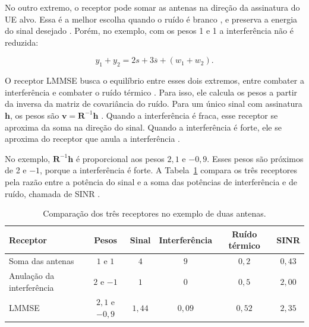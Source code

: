 No outro extremo, o receptor pode somar as antenas na direção da assinatura do UE alvo. Essa é a melhor escolha quando o ruído é branco \cite[p.~359]{tse-viswanath}, e preserva a energia do sinal desejado \cite[p.~358]{tse-viswanath}. Porém, no exemplo, com os pesos 1 e 1 a interferência não é reduzida:

$$
y_1 + y_2 = 2s + 3\overline{s} + (w_1 + w_2).
$$



O receptor LMMSE busca o equilíbrio entre esses dois extremos, entre combater a interferência e combater o ruído térmico \cite[p.~358]{tse-viswanath}. Para isso, ele calcula os pesos a partir da inversa da matriz de covariância do ruído. Para um único sinal com assinatura $\mathbf{h}$, os pesos são $\mathbf{v}=\mathbf{R}^{-1}\mathbf{h}$ \cite[p.~359]{tse-viswanath}. Quando a interferência é fraca, esse receptor se aproxima da soma na direção do sinal. Quando a interferência é forte, ele se aproxima do receptor que anula a interferência \cite[p.~360]{tse-viswanath}.

No exemplo, $\mathbf{R}^{-1}\mathbf{h}$ é proporcional aos pesos $2{,}1$ e $-0{,}9$. Esses pesos são próximos de 2 e $-1$, porque a interferência é forte. A Tabela~\ref{tab:comparacao_receptores} compara os três receptores pela razão entre a potência do sinal e a soma das potências de interferência e de ruído, chamada de SINR \cite[p.~358]{tse-viswanath}.

\begin{table}[htbp]
\caption{Comparação dos três receptores no exemplo de duas antenas.}
\label{tab:comparacao_receptores}
\centering
\begin{tabular}{lccccc}
\hline
Receptor & Pesos & Sinal & Interferência & Ruído térmico & SINR \\
\hline
Soma das antenas & $1$ e $1$ & $4$ & $9$ & $0{,}2$ & $0{,}43$ \\
Anulação da interferência & $2$ e $-1$ & $1$ & $0$ & $0{,}5$ & $2{,}00$ \\
LMMSE & $2{,}1$ e $-0{,}9$ & $1{,}44$ & $0{,}09$ & $0{,}52$ & $2{,}35$ \\
\hline
\end{tabular}
\end{table}

